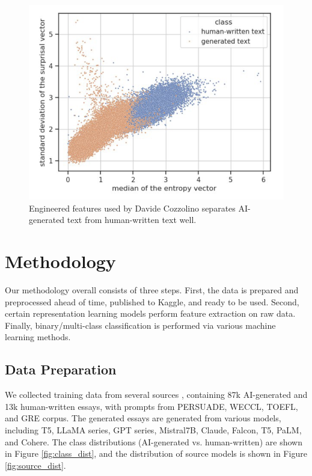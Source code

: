 \documentclass[conference]{IEEEtran}
\begin{document}
\begin{figure}[htbp]
  \centerline{\includegraphics[width=\columnwidth]{figs/cozzolino.png}}
  \caption{Engineered features used by Davide Cozzolino \cite{6thplace} separates AI-generated text from human-written text well.}
  \label{fig:cozzolino}
\end{figure}

\section{Methodology}

Our methodology overall consists of three steps. First, the data is prepared and preprocessed ahead of time, published to Kaggle, and ready to be used. Second, certain representation learning models perform feature extraction on raw data. Finally, binary/multi-class classification is performed via various machine learning methods.

\subsection{Data Preparation}
\label{sec:data}

We collected training data from several sources \cite{persuade,mistral7btext,argugpt,daigtv4,fpeprocessed}, containing 87k AI-generated and 13k human-written essays, with prompts from PERSUADE, WECCL, TOEFL, and GRE corpus. The generated essays are generated from various models, including T5, LLaMA series, GPT series, Mistral7B, Claude, Falcon, T5, PaLM, and Cohere. The class distributions (AI-generated vs. human-written) are shown in Figure \ref{fig:class_dist}, and the distribution of source models is shown in Figure \ref{fig:source_dist}.
\end{document}
